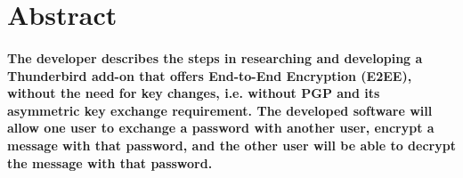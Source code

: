 \newpage
\section{Abstract}

\paragraph{The developer describes the steps in researching and developing a Thunderbird add-on that offers End-to-End Encryption (E2EE), without the need for key changes, i.e. without PGP and its asymmetric key exchange requirement. The developed software will allow one user to exchange a password with another user, encrypt a message with that password, and the other user will be able to decrypt the message with that password.}